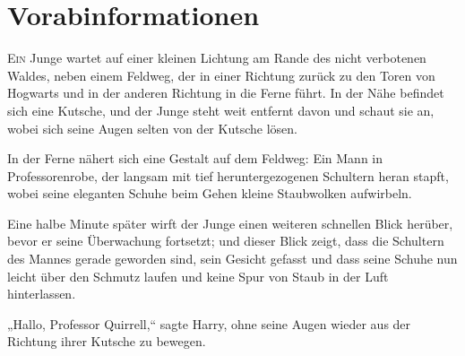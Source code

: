 \chapter{Vorabinformationen}

\lettrine{E}{in} Junge wartet auf einer kleinen Lichtung am Rande des nicht verbotenen Waldes, neben einem Feldweg, der in einer Richtung zurück zu den Toren von Hogwarts und in der anderen Richtung in die Ferne führt. In der Nähe befindet sich eine Kutsche, und der Junge steht weit entfernt davon und schaut sie an, wobei sich seine Augen selten von der Kutsche lösen.

In der Ferne nähert sich eine Gestalt auf dem Feldweg: Ein Mann in Professorenrobe, der langsam mit tief heruntergezogenen Schultern heran stapft, wobei seine eleganten Schuhe beim Gehen kleine Staubwolken aufwirbeln.

Eine halbe Minute später wirft der Junge einen weiteren schnellen Blick herüber, bevor er seine Überwachung fortsetzt; und dieser Blick zeigt, dass die Schultern des Mannes gerade geworden sind, sein Gesicht gefasst und dass seine Schuhe nun leicht über den Schmutz laufen und keine Spur von Staub in der Luft hinterlassen.

„Hallo, Professor Quirrell,“ sagte Harry, ohne seine Augen wieder aus der Richtung ihrer Kutsche zu bewegen.

